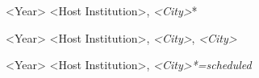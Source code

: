 
\begin{cvskills}
	
	\cvskill
	{<Year> \vspace{0.0cm}}
	{<Host Institution>, \textit{<City>}*}
	
	\cvskill
	{<Year> \vspace{0.0cm}} %
	{<Host Institution>, \textit{<City>}\enskip\cdotp\enskip <Host Institution>, \textit{<City>}}
	
	\cvskill
	{<Year> \vspace{0.0cm}}
	{<Host Institution>, \textit{<City>}\hfill \textit{*=scheduled}}
	
\end{cvskills}
